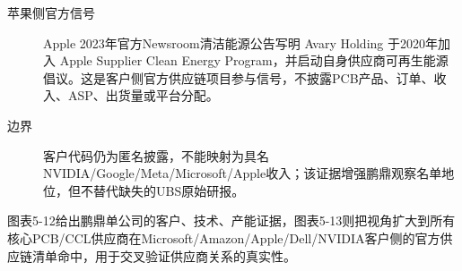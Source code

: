 \begin{exhibitbox}[图表5-12：鹏鼎控股HKEX文件客户与技术证据]
\begin{description}
  \item[苹果侧官方信号] Apple 2023年官方Newsroom清洁能源公告写明 Avary Holding 于2020年加入 Apple Supplier Clean Energy Program，并启动自身供应商可再生能源倡议。这是客户侧官方供应链项目参与信号，不披露PCB产品、订单、收入、ASP、出货量或平台分配。
  \item[边界] 客户代码仍为匿名披露，不能映射为具名NVIDIA/Google/Meta/Microsoft/Apple收入；该证据增强鹏鼎观察名单地位，但不替代缺失的UBS原始研报。
\end{description}
\end{exhibitbox}

图表5-12给出鹏鼎单公司的客户、技术、产能证据，图表5-13则把视角扩大到所有核心PCB/CCL供应商在Microsoft/Amazon/Apple/Dell/NVIDIA客户侧的官方供应链清单命中，用于交叉验证供应商关系的真实性。

